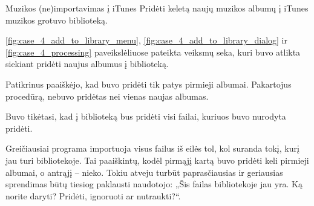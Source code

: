 \begin{xcase}{Muzikos (ne)importavimas į iTunes}
  \xcgoal
  {
    Pridėti keletą naujų muzikos albumų į iTunes muzikos grotuvo biblioteką.
  }
  
  \xctools
  {
    \ref{fig:case_4_add_to_library_menu},
    \ref{fig:case_4_add_to_library_dialog} ir
    \ref{fig:case_4_processing} paveikslėliuose pateikta veiksmų seka, kuri
    buvo atlikta siekiant pridėti naujus albumus į biblioteką.

  }
  
  \xcresult
  {
    Patikrinus paaiškėjo, kad buvo pridėti tik patys pirmieji albumai.
    Pakartojus procedūrą, nebuvo pridėtas nei vienas naujas albumas. 
  }
  
  \xcprinciples
  {
    {
      Buvo tikėtasi, kad į biblioteką bus pridėti visi failai, kuriuos buvo nurodyta pridėti.
    }
  }
  
  \xcthoughts
  {
    Greičiausiai programa importuoja visus failus iš eilės tol, kol suranda
    tokį, kurį jau turi bibliotekoje. Tai paaiškintų, kodėl pirmąjį kartą
    buvo pridėti keli pirmieji albumai, o antrąjį – nieko. Tokiu atveju
    turbūt paprasčiausias ir geriausias sprendimas būtų tiesiog paklausti
    naudotojo: „Šis failas bibliotekoje jau yra. Ką norite daryti? Pridėti,
    ignoruoti ar nutraukti?“.
  }
\end{xcase}
